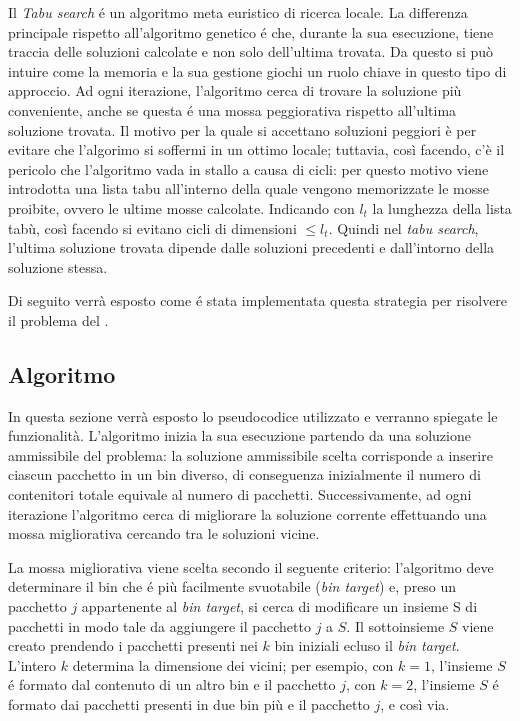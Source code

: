 Il \textit{Tabu search} é un algoritmo meta euristico di ricerca locale. La differenza principale rispetto all'algoritmo genetico é che, durante la sua esecuzione, tiene traccia delle soluzioni calcolate e non solo dell'ultima trovata. Da questo si può intuire come la memoria e la sua gestione giochi un ruolo chiave in questo tipo di approccio. Ad ogni iterazione, l'algoritmo cerca di trovare la soluzione più conveniente, anche se questa é una mossa peggiorativa rispetto all'ultima soluzione trovata. Il motivo per la quale si accettano soluzioni peggiori è per evitare che l'algorimo si soffermi in un ottimo locale; tuttavia, così facendo, c'è il pericolo che l'algoritmo vada in stallo a causa di cicli: per questo motivo viene introdotta una lista tabu all'interno della quale vengono memorizzate le mosse proibite, ovvero le ultime mosse calcolate. Indicando con $l_t$ la lunghezza della lista tabù, così facendo si evitano cicli di dimensioni $\le l_t$. Quindi nel \textit{tabu search}, l'ultima soluzione trovata dipende dalle soluzioni precedenti e dall'intorno della soluzione stessa.
   
Di seguito verrà esposto come é stata implementata questa strategia per risolvere il problema del \ddbp.

\subsection{Algoritmo}
In questa sezione verrà esposto lo pseudocodice utilizzato e verranno spiegate le funzionalità.
L'algoritmo inizia la sua esecuzione partendo da una soluzione ammissibile del problema: la soluzione ammissibile scelta corrisponde a inserire ciascun pacchetto in un bin diverso, di conseguenza inizialmente il numero di contenitori totale equivale al numero di pacchetti. Successivamente, ad ogni iterazione l'algoritmo cerca di migliorare la soluzione corrente effettuando una mossa migliorativa cercando tra le soluzioni vicine.

La mossa migliorativa viene scelta secondo il seguente criterio: l'algoritmo deve determinare il bin che é più facilmente svuotabile (\textit{bin target}) e, preso un pacchetto $j$ appartenente al \textit{bin target}, si cerca di modificare un insieme S di pacchetti in modo tale da aggiungere il pacchetto $j$ a $S$. Il sottoinsieme $S$ viene creato prendendo i pacchetti presenti nei $k$ bin iniziali ecluso il \textit{bin target}. L'intero $k$ determina la dimensione dei vicini; per esempio, con $k=1$, l'insieme $S$ é formato dal contenuto di un altro bin e il pacchetto $j$, con $k=2$, l'insieme $S$ é formato dai pacchetti presenti in due bin più e il pacchetto $j$, e così via.


